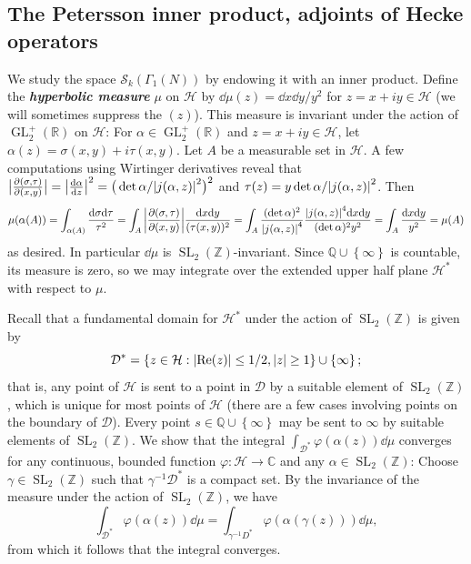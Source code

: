 \documentclass[10pt,leqno,twoside]{article}
\theoremstyle{plain}
\theoremstyle{definition}
\numberwithin{equation}{section}
\numberwithin{lem}{section}
\newcommand{\cbr}[1]{\left\{#1\right\}}
\newcommand{\textib}[1]{\textbf{\textit{#1\index{#1}}}} %
\DeclareMathOperator{\GL}{GL}
\DeclareMathOperator{\SL}{SL}
\newcommand{\slz}{\SL_2(\mathbb{Z})}
\newcommand{\glrp}{\GL_2^+(\mathbb{R})}
\begin{document}
\subsection{The Petersson inner product, adjoints of Hecke operators}
We study the space $\mathcal S_k(\varGamma_1(N))$ by endowing it with an inner product. Define the \textib{hyperbolic measure} $\mu$ on $\mathcal H$ by $\dd\mu(z) = \dd x \dd y / y^2$ for $z = x+iy\in\mathcal H$ (we will sometimes suppress the $(z)$). This measure is invariant under the action of $\glrp$ on $\mathcal H$: For $\alpha \in \glrp$ and $z=x+iy \in \mathcal H$, let $\alpha(z) = \sigma(x,y) + i\tau(x,y)$. Let $A$ be a measurable set in $\mathcal H$. A few computations using Wirtinger derivatives reveal that $\big|\frac{\partial (\sigma,\tau)}{\partial(x,y)}\big| = \abs{\dv{\alpha}{z}}^2 = \big(\det\alpha/\abs{j(\alpha,z)}^2\big)^2$ and $\tau(z) = y\det\alpha/\abs{j(\alpha,z)}^2$. Then \[\mu(\alpha(A)) = \int_{\alpha(A)} \frac{\dd\sigma\dd\tau}{\tau^2} = \int_{A}\bigg|\frac{\partial (\sigma,\tau)}{\partial(x,y)}\bigg|\frac{\dd x\dd y}{(\tau(x,y))^2} = \int_A \frac{(\det\alpha)^2}{\abs{j(\alpha,z)}^4}\frac{\abs{j(\alpha,z)}^4\dd x \dd y}{(\det\alpha)^2y^2} =\int_A \frac{\dd x \dd y}{y^2} = \mu(A)\]
as desired. In particular $\dd \mu$ is $\slz$-invariant. Since $\mathbb Q\cup\cbr{\infty}$ is countable, its measure is zero, so we may integrate over the extended upper half plane $\mathcal H^\ast$ with respect to $\mu$.

Recall that a fundamental domain for $\mathcal H^\ast$ under the action of $\slz$ is given by 
\[\mathcal D^\ast = \cbr{z\in\mathcal H : \abs{\Re(z)}\leq 1/2,\abs{z}\geq 1}\cup\cbr{\infty};\] that is, any point of $\mathcal H$ is sent to a point in $\mathcal D$ by a suitable element of $\slz$, which is unique for most points of $\mathcal H$ (there are a few cases involving points on the boundary of $\mathcal D$). Every point $s\in\mathbb Q\cup\cbr{\infty}$ may be sent to $\infty$ by suitable elements of $\slz$. We show that the integral $\int_{\mathcal D^\ast} \varphi(\alpha(z))\dd \mu$ converges for any continuous, bounded function $\varphi\colon\mathcal H\to\mathbb C$ and any $\alpha\in\slz$: Choose $\gamma\in\slz$ such that $\gamma^{-1}\mathcal D^\ast$ is a compact set. By the invariance of the measure under the action of $\slz$, we have
\[\int_{\mathcal D^\ast} \varphi(\alpha(z))\dd \mu = \int_{\mathcal \gamma^{-1} D^\ast} \varphi(\alpha(\gamma(z)))\dd \mu, \] from which it follows that the integral converges.
\end{document}
